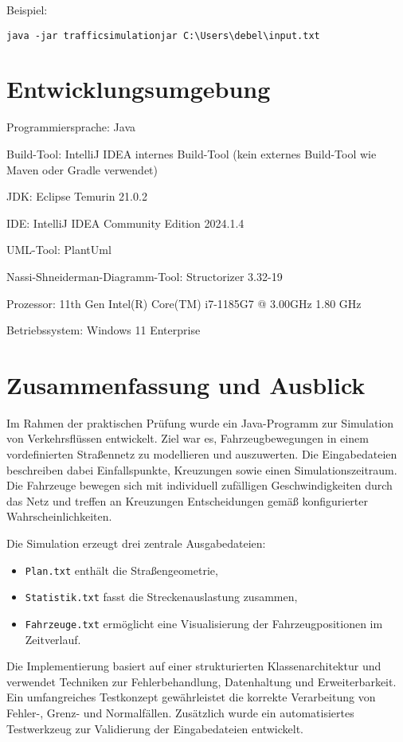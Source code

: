 \documentclass[a4paper,12pt]{report}
\begin{document}
Beispiel:


\texttt{java -jar trafficsimulationjar C:\textbackslash Users\textbackslash debel\textbackslash input.txt}



\chapter{Entwicklungsumgebung}
Programmiersprache: Java

Build-Tool: IntelliJ IDEA internes Build-Tool (kein externes Build-Tool wie Maven oder Gradle verwendet)

JDK: Eclipse Temurin 21.0.2

IDE: IntelliJ IDEA Community Edition 2024.1.4

UML-Tool: PlantUml

Nassi-Shneiderman-Diagramm-Tool: Structorizer 3.32-19

Prozessor: 11th Gen Intel(R) Core(TM) i7-1185G7 @ 3.00GHz   1.80 GHz 

Betriebssystem: Windows 11 Enterprise

\chapter{Zusammenfassung und Ausblick}

Im Rahmen der praktischen Prüfung wurde ein Java-Programm zur Simulation von Verkehrsflüssen entwickelt. Ziel war es, Fahrzeugbewegungen in einem vordefinierten Straßennetz zu modellieren und auszuwerten.
Die Eingabedateien beschreiben dabei Einfallspunkte, Kreuzungen sowie einen Simulationszeitraum. Die Fahrzeuge bewegen sich mit individuell zufälligen Geschwindigkeiten durch das Netz und treffen an Kreuzungen Entscheidungen gemäß konfigurierter Wahrscheinlichkeiten.

Die Simulation erzeugt drei zentrale Ausgabedateien:
\begin{itemize}
    \item \texttt{Plan.txt} enthält die Straßengeometrie,
    \item \texttt{Statistik.txt} fasst die Streckenauslastung zusammen,
    \item \texttt{Fahrzeuge.txt} ermöglicht eine Visualisierung der Fahrzeugpositionen im Zeitverlauf.
\end{itemize}

Die Implementierung basiert auf einer strukturierten Klassenarchitektur und verwendet Techniken zur Fehlerbehandlung, Datenhaltung und Erweiterbarkeit.
Ein umfangreiches Testkonzept gewährleistet die korrekte Verarbeitung von Fehler-, Grenz- und Normalfällen.
Zusätzlich wurde ein automatisiertes Testwerkzeug zur Validierung der Eingabedateien entwickelt.
\end{document}
